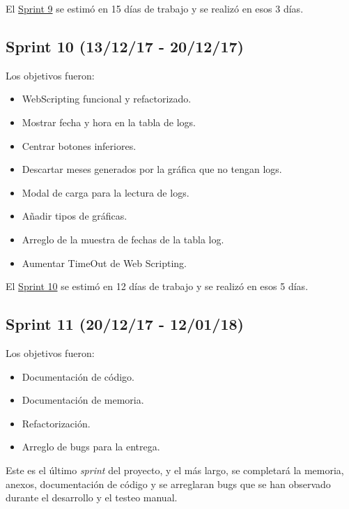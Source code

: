 El \href{https://github.com/trona85/GII-17.1B-UBULog-1.0/milestone/9?closed=1}{Sprint 9} se estimó en 15 días de trabajo y se realizó en esos 3 días.

\newpage
\subsection{Sprint 10 (13/12/17 -
	20/12/17)}\label{sprint-10-131217---201217}

Los objetivos fueron:
\begin{itemize}
	\tightlist
	\item
	WebScripting funcional y refactorizado.
	\item
	Mostrar fecha y hora en la tabla de logs.
	\item
	Centrar botones inferiores.
	\item
	Descartar meses generados por la gráfica que no tengan logs.
	\item
	Modal de carga para la lectura de logs.
	\item
	Añadir tipos de gráficas.
	\item
	Arreglo de la muestra de fechas de la tabla log.
	\item
	Aumentar TimeOut de Web Scripting.
	
\end{itemize}

El \href{https://github.com/trona85/GII-17.1B-UBULog-1.0/milestone/10?closed=1}{Sprint 10} se estimó en 12 días de trabajo y se realizó en esos 5 días.

\newpage
\subsection{Sprint 11 (20/12/17 -
	12/01/18)}\label{sprint-11-201217---120118}

Los objetivos fueron:
\begin{itemize}
	\tightlist
	\item
	Documentación de código.
	\item
	Documentación de memoria.
	\item
	Refactorización.
	\item
	Arreglo de bugs para la entrega.
	
\end{itemize}

Este es el último \emph{sprint} del proyecto, y el más largo, se completará la memoria, anexos, documentación de código y se arreglaran bugs que se han observado durante el desarrollo y el testeo manual.

